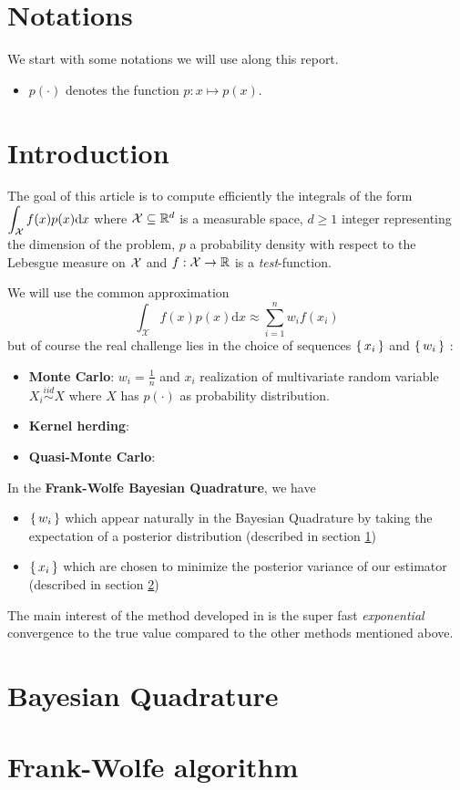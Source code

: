 \section*{Notations}
We start with some notations we will use along this report.
\begin{itemize}[font= \color{blue} \large, label= $\bullet$]
 \item $p(\cdot)$ denotes the function $p: x \mapsto p(x)$.
\end{itemize}

\section*{Introduction}

The goal of this article \cite{FWBQ} is to compute efficiently the integrals of the form
$ \displaystyle \int _ { \mathcal{X} } f ( x ) p ( x ) \mathrm { d } x$
where $\mathcal{X} \subseteq \mathbb{R} ^ { d }$ is a measurable space,
$d \geq 1$ integer representing the dimension of the problem, $p$ a probability
density with respect to the Lebesgue measure on $\mathcal{X}$ and $f : \mathcal{X} \rightarrow \mathbb{R}$
 is a \textit{test}-function.

 We will use the common approximation
 \begin{equation}
\int _ { \mathcal { X } } f ( x ) p ( x ) \mathrm { d } x \approx \sum _ { i = 1 } ^ { n } w _ { i } f \left( x _ { i } \right)
 \end{equation}
 but of course the real challenge lies in the choice of sequences $\left \{ \, x_i \, \right \}$ and
 $\left \{ \, w_i \, \right \}$ :
  \begin{itemize}[font= \color{blue} \large, label= $\bullet$]
    \item \textbf{Monte Carlo}: $w_i = \frac{1}{n}$ and $x_i$ realization of multivariate
    random variable $X_i \stackrel{iid}{\sim} X$ where $X$ has $p(\cdot)$ as probability
    distribution.
    \item \textbf{Kernel herding}:
    \item \textbf{Quasi-Monte Carlo}:
  \end{itemize}

  In the \textbf{Frank-Wolfe Bayesian Quadrature}, we have
  \begin{itemize}[font= \color{blue} \large, label= ]
\item $\left \{ \, w_i \, \right \}$ which appear naturally in the Bayesian Quadrature by taking the expectation of a posterior distribution  (described in section \ref{sec:BQ})
\item $\left \{ \, x_i \, \right \}$ which are chosen to minimize the posterior variance of our estimator
 (described in section \ref{sec:FW})
  \end{itemize}

  The main interest of the method developed in \cite{FWBQ} is the super fast
  \textit{exponential} convergence to the true value compared to the other methods mentioned above. 



\section{Bayesian Quadrature}
\label{sec:BQ}

\section{Frank-Wolfe algorithm}
\label{sec:FW}
